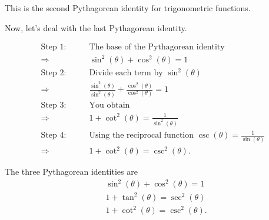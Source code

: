 This is the second Pythagorean identity for trigonometric functions.

Now, let's deal with the last Pythagorean identity.

\begin{align*}
	\textrm{Step 1:}\qquad & \textrm{The base of the Pythagorean identity}                                             \\
	\Rightarrow\qquad      & \sin^{2}(\theta) + \cos^{2}(\theta) = 1                                                   \\
	\textrm{Step 2:}\qquad & \textrm{Divide each term by $\sin^{2}(\theta)$}                                           \\
	\Rightarrow\qquad      & \frac{\sin^{2}(\theta)}{\sin^{2}(\theta)} + \frac{\cos^{2}(\theta)}{\cos^{2}(\theta)} = 1 \\
	\textrm{Step 3:}\qquad & \textrm{You obtain}                                                                       \\
	\Rightarrow\qquad      & 1 + \cot^{2}(\theta) = \frac{1}{\sin^{2}(\theta)}                                         \\
	\textrm{Step 4:}\qquad & \textrm{Using the reciprocal function $\csc(\theta) = \frac{1}{\sin(\theta)}$}            \\
	\Rightarrow\qquad      & 1 + \cot^{2}(\theta) = \csc^{2}(\theta)
	.\end{align*}

\begin{identity}
	\label{idn:the_three_pythagorean_identities}

	The three Pythagorean identities are
	\begin{align*}
		 & \sin^{2}(\theta) + \cos^{2}(\theta) = 1 \\
		 & 1 + \tan^{2}(\theta) = \sec^{2}(\theta) \\
		 & 1 + \cot^{2}(\theta) = \csc^{2}(\theta)
		.\end{align*}
\end{identity}


